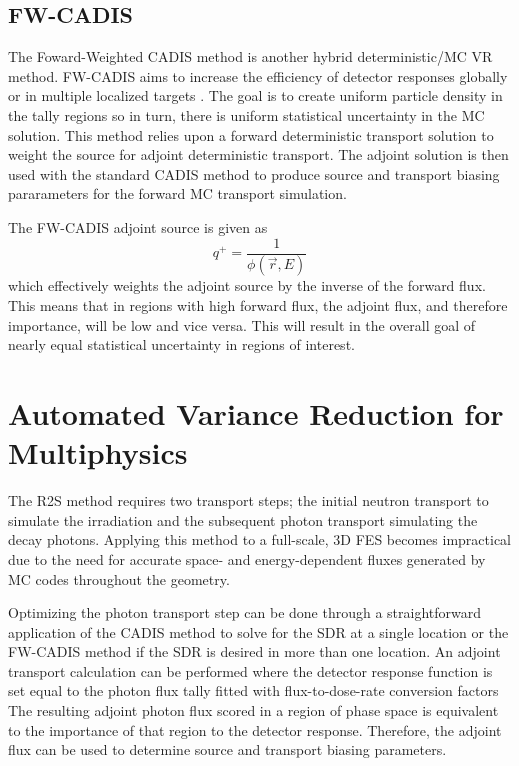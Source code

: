 \subsection{FW-CADIS}
The Foward-Weighted CADIS method is another hybrid deterministic/MC VR method.
FW-CADIS aims to increase the efficiency of 
detector responses globally or in multiple localized targets \cite{fwcadis}.
The goal is to create uniform particle density in the tally regions so in turn,
there is uniform statistical uncertainty in the MC solution.
This method relies upon a forward deterministic transport solution to
weight the source for adjoint deterministic transport.  The adjoint solution is
then used with the standard CADIS method to produce source and transport
biasing pararameters for the forward MC transport simulation.

The FW-CADIS adjoint source is given as
\begin{equation}
	q^{+} = \frac{1}{\phi(\overrightarrow{r}, E)}
\end{equation}
which effectively weights the adjoint source by the inverse of the forward flux.
This means that in regions with high forward flux, the adjoint flux, and therefore
importance, will be low and vice versa.  This will result in the overall goal of
nearly equal statistical uncertainty in regions of interest.


\section{Automated Variance Reduction for Multiphysics}\label{sec:auto_vr_sdr}

The R2S method requires two transport steps; 
the initial neutron transport to simulate the irradiation and the subsequent photon
transport simulating the decay photons.  
Applying this method to a full-scale, 3D FES becomes impractical due to the
need for accurate space- and energy-dependent fluxes generated by MC codes 
throughout the geometry.  

Optimizing the photon transport step  
can be done through a straightforward application of the CADIS method to solve 
for the SDR at a single location or the FW-CADIS method if the SDR is desired
in more than one location. 
An adjoint transport calculation can be performed where the detector
response function is set equal to the photon flux tally fitted with
flux-to-dose-rate conversion factors
The resulting adjoint photon flux scored in a region of phase space is equivalent
to the importance of that region to the detector response.
Therefore, the adjoint flux can be used to determine source and transport
biasing parameters.

